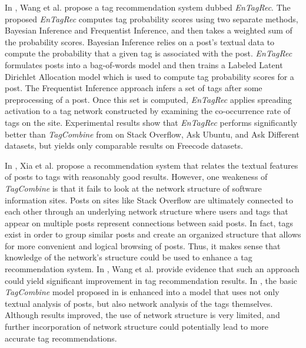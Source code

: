 \documentclass[10pt]{IEEEtran}
\begin{document}
In \cite{5}, Wang et al. propose a tag recommendation system dubbed \textit{EnTagRec}. The proposed \textit{EnTagRec} computes tag probability scores using two separate methods, Bayesian Inference and Frequentist Inference, and then takes a weighted sum of the probability scores. Bayesian Inference relies on a post’s textual data to compute the probability that a given tag is associated with the post. \textit{EnTagRec} formulates posts into a bag-of-words model and then trains a Labeled Latent Dirichlet Allocation model which is used to compute tag probability scores for a post. The Frequentist Inference approach infers a set of tags after some preprocessing of a post. Once this set is computed, \textit{EnTagRec} applies spreading activation to a tag network constructed by examining the co-occurrence rate of tags on the site. Experimental results show that \textit{EnTagRec} performs significantly better than \textit{TagCombine} from \cite{1} on Stack Overflow, Ask Ubuntu, and Ask Different datasets, but yields only comparable results on Freecode datasets.

In \cite{1}, Xia et al. propose a recommendation system that relates the textual features of posts to tags with reasonably good results. However, one weakeness of \textit{TagCombine} is that it fails to look at the network structure of software information sites. Posts on sites like Stack Overflow are ultimately connected to each other through an underlying network structure where users and tags that appear on multiple posts represent connections between said posts. In fact, tags exist in order to group similar posts and create an organized structure that allows for more convenient and logical browsing of posts. Thus, it makes sense that knowledge of the network’s structure could be used to enhance a tag recommendation system. In \cite{5}, Wang et al. provide evidence that such an approach could yield significant improvement in tag recommendation results. In \cite{5}, the basic \textit{TagCombine} model proposed in \cite{1} is enhanced into a model that uses not only textual analysis of posts, but also network analysis of the tags themselves. Although results improved, the use of network structure is very limited, and further incorporation of network structure could potentially lead to more accurate tag recommendations.
\end{document}
